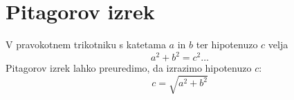 \documentclass{article}
\begin{document}
\section*{Pitagorov izrek}
V pravokotnem trikotniku s katetama \(a\) in \(b\) ter hipotenuzo \(c\) velja
\[ a^2 + b^2 = c^2 \dots\]
Pitagorov izrek lahko preuredimo, da izrazimo hipotenuzo \(c\):
\[
c = \sqrt{a^2 + b^2}
\]
\end{document}
